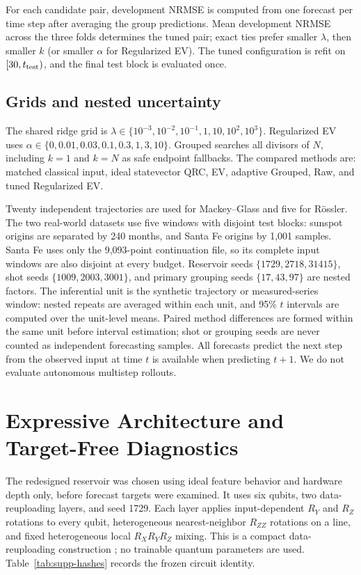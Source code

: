 \documentclass[10pt,conference]{IEEEtran}
\begin{document}
For each candidate pair, development NRMSE is computed from one forecast per
time step after averaging the group predictions. Mean development NRMSE across
the three folds determines the tuned pair; exact ties prefer smaller $\lambda$,
then smaller $k$ (or smaller $\alpha$ for Regularized EV). The tuned configuration
is refit on $[30,t_{\rm test})$, and the final test block is evaluated once.

\subsection{Grids and nested uncertainty}

The shared ridge grid is
$\lambda\in\{10^{-3},10^{-2},10^{-1},1,10,10^2,10^3\}$. Regularized EV uses
$\alpha\in\{0,0.01,0.03,0.1,0.3,1,3,10\}$.  Grouped searches all divisors of
$N$, including $k=1$ and $k=N$ as safe endpoint fallbacks.  The compared
methods are: matched classical input, ideal statevector QRC, EV, adaptive
Grouped, Raw, and tuned Regularized EV.

Twenty independent trajectories are used for Mackey--Glass and five for
R\"ossler. The two real-world datasets use five windows with disjoint test blocks: sunspot origins
are separated by 240 months, and Santa Fe origins by 1,001 samples. Santa Fe
uses only the 9,093-point continuation file, so its complete input windows are
also disjoint at every budget. Reservoir seeds
$\{1729,2718,31415\}$, shot seeds $\{1009,2003,3001\}$, and primary grouping
seeds $\{17,43,97\}$ are nested factors. The inferential unit is the synthetic
trajectory or measured-series window: nested repeats are averaged within each unit,
and 95\% $t$ intervals are computed over the unit-level means.  Paired
method differences are formed within the same unit before interval estimation;
shot or grouping seeds are never counted as independent forecasting samples.
All forecasts predict the next step from the observed input at
time $t$ is available when predicting $t+1$.  We do not evaluate autonomous
multistep rollouts.

\section{Expressive Architecture and Target-Free Diagnostics}
\label{app:architecture}

The redesigned reservoir was chosen using ideal feature behavior and hardware
depth only, before forecast targets were examined.  It uses six qubits, two
data-reuploading layers, and seed 1729.  Each layer applies input-dependent
$R_Y$ and $R_Z$ rotations to every qubit, heterogeneous nearest-neighbor
$R_{ZZ}$ rotations on a line, and fixed heterogeneous local $R_XR_YR_Z$
mixing.  This is a compact data-reuploading construction
\cite{perezsalinas2020data}; no trainable quantum parameters are used.
Table~\ref{tab:supp-hashes} records the frozen circuit identity.
\end{document}
